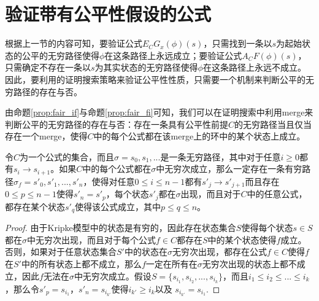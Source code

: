 \section{验证带有公平性假设的公式}
根据上一节的内容可知，要验证公式$E_CG_x(\phi)(s)$，只需找到一条以$s$为起始状态的公平的无穷路径使得$\phi$在这条路径上永远成立；要验证公式$A_CF(\phi)(s)$，只需确定不存在一条以$s$为其实状态的无穷路径使得$\phi$在这条路径上永远不成立。因此，要利用\SCTL{}的证明搜索策略来验证公平性性质，只需要一个机制来判断公平的无穷路径的存在与否。

由命题\ref{prop:fair_if}与命题\ref{prop:fair_fi}可知，我们可以在证明搜索中利用merge来判断公平的无穷路径的存在与否：存在一条具有公平性前提$C$的无穷路径当且仅当存在一个merge，使得$C$中的每个公式都在该merge上的环中的某个状态上成立。



\begin{proposition}\label{prop:fair_if}
	令$C$为一个\CTLP{}公式的集合，而且$\sigma = s_0,s_1,...$是一条无穷路径，其中对于任意$i\ge 0$都有$s_i \rightarrow s_{i+1}$。如果$C$中的每个公式都在$\sigma$中无穷次成立，那么一定存在一条有穷路径$\sigma_f = s'_0,s'_1,...,s'_n$，使得对任意$0\le i\le n-1$都有$s'_j\rightarrow s'_{j+1}$而且存在$0\le p\le n-1$使得$s'_n = s'_p$，每个状态$s'_j$都在$\sigma$出现，而且对于$C$中的任意公式，都存在某个状态$s'_q$使得该公式成立，其中$p\le q\le n$。
\end{proposition}
\begin{proof}
	由于Kripke模型中的状态是有穷的，因此存在状态集合$S$使得每个状态$s\in S$都在$\sigma$中无穷次出现，而且对于每个公式$f\in C$都存在$S$中的某个状态使得$f$成立。否则，如果对于任意状态集合$S'$中的状态在$\sigma$无穷次出现，都存在公式$f\in C$使得$f$在$S'$中的所有状态上都不成立，那么$f$一定在所有在$\sigma$无穷次出现的状态上都不成立，因此$f$无法在$\sigma$中无穷次成立。假设$S = \{s_{i_1},s_{i_2},...,s_{i_k}\}$，而且$i_1\le i_2\le ...\le i_k$，那么令$s'_p = s_{i_1}$，$s'_n = s_{i_{k'}}$使得$i_{k'} \ge i_k$以及 $s_{i_{k'}} = s_{i_1}$.
\end{proof}

